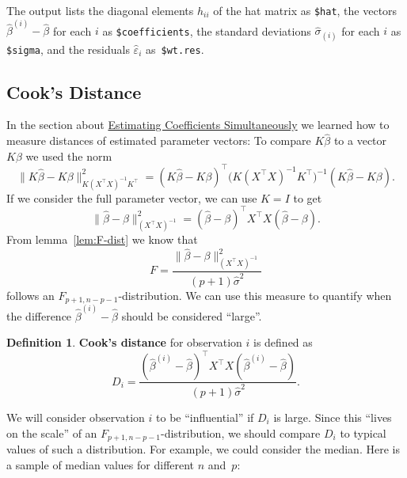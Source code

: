 \documentclass[
  a4paper,
]{article}
\theoremstyle{definition}
\newtheorem{definition}{Definition}[section]
\theoremstyle{definition}
\theoremstyle{definition}
\theoremstyle{definition}
\theoremstyle{remark}
\begin{document}
The output lists the diagonal elements \(h_{ii}\) of the hat matrix
as \texttt{\$hat}, the vectors \(\hat\beta^{(i)} - \hat\beta\) for each \(i\)
as \texttt{\$coefficients}, the standard deviations \(\hat\sigma_{(i)}\)
for each \(i\) as \texttt{\$sigma}, and the residuals \(\hat\varepsilon_i\) as~\texttt{\$wt.res}.

\hypertarget{cooks-distance}{%
\subsection{Cook's Distance}\label{cooks-distance}}

In the section about \protect\hyperlink{S06-simultaneous}{Estimating Coefficients Simultaneously} we learned
how to measure distances of estimated parameter vectors: To compare
\(K\hat\beta\) to a vector \(K\beta\) we used the norm
\begin{equation*}
  \bigl\| K\hat\beta - K\beta \bigr\|_{K(X^\top X)^{-1}K^\top}^2
  = (K\hat\beta - K\beta)^\top \bigl(K(X^\top X)^{-1}K^\top\bigr)^{-1} (K\hat\beta - K\beta).
\end{equation*}
If we consider the full parameter vector, we can use \(K = I\) to get
\begin{equation*}
  \bigl\| \hat\beta - \beta \bigr\|_{(X^\top X)^{-1}}^2
  = (\hat\beta - \beta)^\top X^\top X (\hat\beta - \beta).
\end{equation*}
From lemma~\ref{lem:F-dist} we know that
\begin{equation*}
  F = \frac{\bigl\| \hat\beta - \beta \bigr\|_{(X^\top X)^{-1}}^2}{(p+1)\hat\sigma^2}
\end{equation*}
follows an \(F_{p+1, n-p-1}\)-distribution. We can use this measure to
quantify when the difference \(\hat\beta^{(i)} - \hat\beta\) should be
considered ``large''.

\begin{definition}
\protect\hypertarget{def:Cook-D}{}\label{def:Cook-D}\textbf{Cook's distance} for observation \(i\) is defined as
\begin{equation*}
  D_i
  = \frac{(\hat\beta^{(i)} - \hat\beta)^\top X^\top X (\hat\beta^{(i)} - \hat\beta)}{(p+1)\hat\sigma^2}.
\end{equation*}
\end{definition}

We will consider observation \(i\) to be ``influential'' if \(D_i\) is large.
Since this ``lives on the scale'' of an \(F_{p+1, n-p-1}\)-distribution,
we should compare \(D_i\) to typical values of such a distribution. For
example, we could consider the median. Here is a sample of median values
for different \(n\) and~\(p\):
\end{document}
